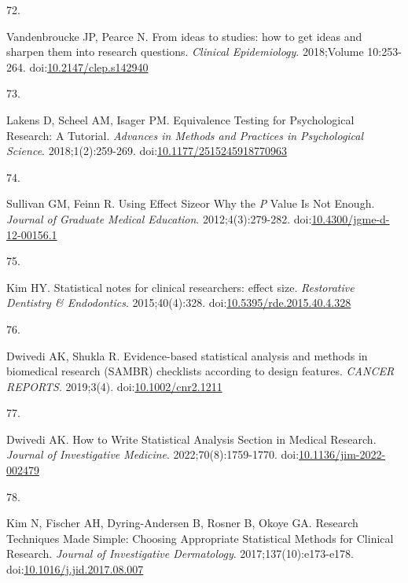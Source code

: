 \documentclass[
]{book}
\newlength{\cslhangindent}
\newlength{\csllabelwidth}
\newlength{\cslentryspacingunit} %
\newenvironment{CSLReferences}[2] %
 {%
  \setlength{\parindent}{0pt}
  \ifodd #1
  \let\oldpar\par
  \def\par{\hangindent=\cslhangindent\oldpar}
  \fi
  \setlength{\parskip}{#2\cslentryspacingunit}
 }%
 {}
\newcommand{\CSLLeftMargin}[1]{\parbox[t]{\csllabelwidth}{#1}}
\newcommand{\CSLRightInline}[1]{\parbox[t]{\linewidth - \csllabelwidth}{#1}\break}
\begin{document}
\begin{CSLReferences}{0}{0}
\leavevmode{}%
\CSLLeftMargin{72. }%
\CSLRightInline{Vandenbroucke JP, Pearce N. From ideas to studies: how to get ideas and sharpen them into research questions. \emph{Clinical Epidemiology}. 2018;Volume 10:253-264. doi:\href{https://doi.org/10.2147/clep.s142940}{10.2147/clep.s142940}}

\leavevmode{}%
\CSLLeftMargin{73. }%
\CSLRightInline{Lakens D, Scheel AM, Isager PM. Equivalence Testing for Psychological Research: A Tutorial. \emph{Advances in Methods and Practices in Psychological Science}. 2018;1(2):259-269. doi:\href{https://doi.org/10.1177/2515245918770963}{10.1177/2515245918770963}}

\leavevmode{}%
\CSLLeftMargin{74. }%
\CSLRightInline{Sullivan GM, Feinn R. Using Effect Size{\textemdash}or Why the {\emph{P}} Value Is Not Enough. \emph{Journal of Graduate Medical Education}. 2012;4(3):279-282. doi:\href{https://doi.org/10.4300/jgme-d-12-00156.1}{10.4300/jgme-d-12-00156.1}}

\leavevmode{}%
\CSLLeftMargin{75. }%
\CSLRightInline{Kim HY. Statistical notes for clinical researchers: effect size. \emph{Restorative Dentistry \& Endodontics}. 2015;40(4):328. doi:\href{https://doi.org/10.5395/rde.2015.40.4.328}{10.5395/rde.2015.40.4.328}}

\leavevmode{}%
\CSLLeftMargin{76. }%
\CSLRightInline{Dwivedi AK, Shukla R. Evidence{-}based statistical analysis and methods in biomedical research (SAMBR) checklists according to design features. \emph{CANCER REPORTS}. 2019;3(4). doi:\href{https://doi.org/10.1002/cnr2.1211}{10.1002/cnr2.1211}}

\leavevmode{}%
\CSLLeftMargin{77. }%
\CSLRightInline{Dwivedi AK. How to Write Statistical Analysis Section in Medical Research. \emph{Journal of Investigative Medicine}. 2022;70(8):1759-1770. doi:\href{https://doi.org/10.1136/jim-2022-002479}{10.1136/jim-2022-002479}}

\leavevmode{}%
\CSLLeftMargin{78. }%
\CSLRightInline{Kim N, Fischer AH, Dyring-Andersen B, Rosner B, Okoye GA. Research Techniques Made Simple: Choosing Appropriate Statistical Methods for Clinical Research. \emph{Journal of Investigative Dermatology}. 2017;137(10):e173-e178. doi:\href{https://doi.org/10.1016/j.jid.2017.08.007}{10.1016/j.jid.2017.08.007}}


\end{CSLReferences}
\end{document}
